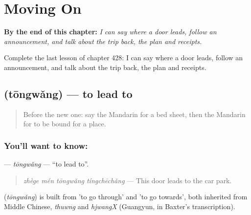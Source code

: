 
\chapter{Moving On}
\label{ch:zh-moving-on}

\begin{chapteropening}
\textbf{By the end of this chapter:} \emph{I can say where a door leads, follow an announcement, and talk about the trip back, the plan and receipts.}

Complete the last lesson of chapter 428: I can say where a door leads, follow an announcement, and talk about the trip back, the plan and receipts.
\end{chapteropening}

\section[\texorpdfstring{\zh{通往} (tōngwǎng)}{通往 (tōngwǎng)}]{ (tōngwǎng) — to lead to}

\label{lesson:ZH-C428-tongwang}



\begin{quote}
Before the new one: say the Mandarin for a bed sheet, then the Mandarin for to be bound for a place.
\end{quote}

\subsection*{You'll want to know: }
\textbf{} — \emph{tōngwǎng} — \textquotedblleft{}to lead to\textquotedblright{}.

\begin{quote}
\textbf{} \emph{zhège mén tōngwǎng tíngchēchǎng} — This door leads to the car park.
\end{quote}

\begin{cousinweb}
\textbf{} (\emph{tōngwǎng}) is built from  'to go through' and  'to go towards', both inherited from Middle Chinese, \emph{thuwng} and \emph{hjwangX} (Guangyun, in Baxter's transcription).
\end{cousinweb}

